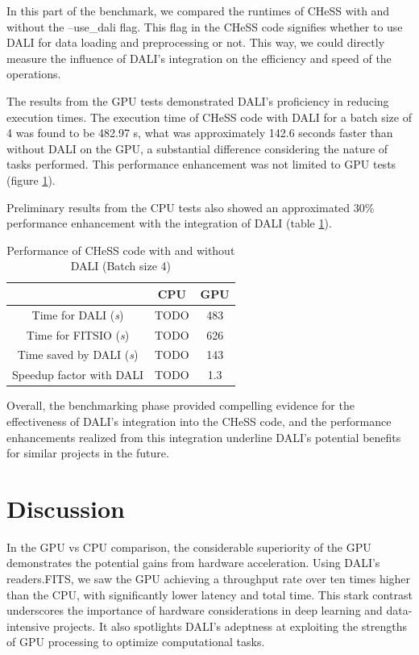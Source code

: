 \documentclass[licencjacka,en]{pracamgr}
\begin{document}
In this part of the benchmark, we compared the runtimes of CHeSS with and without the --use\_dali flag. This flag in the CHeSS code signifies whether to use DALI for data loading and preprocessing or not. This way, we could directly measure the influence of DALI's integration on the efficiency and speed of the operations.

The results from the GPU tests demonstrated DALI's proficiency in reducing execution times. The execution time of CHeSS code with DALI for a batch size of 4 was found to be 482.97 s, what was approximately 142.6 seconds faster than without DALI on the GPU, a substantial difference considering the nature of tasks performed. This performance enhancement was not limited to GPU tests (figure \ref{CHeSS}). 

Preliminary results from the CPU tests also showed an approximated 30\% performance enhancement with the integration of DALI (table \ref{CHeSS}).

\renewcommand{\arraystretch}{2}
\begin{table}[H]
    \centering
    \begin{tabular}{|c|c|c|}
        \hline
        & CPU & GPU \\\hline
        Time for DALI (\textit{s}) & TODO & 483 \\\hline
        Time for FITSIO (\textit{s}) & TODO & 626  \\\hline
        Time saved by DALI (\textit{s}) & TODO & 143  \\\hline
        Speedup factor with DALI & TODO & 1.3  \\\hline
    \end{tabular}
    \caption{\label{CHeSS} Performance of CHeSS code with and without DALI (Batch size 4)}
\end{table}


Overall, the benchmarking phase provided compelling evidence for the effectiveness of DALI's integration into the CHeSS code, and the performance enhancements realized from this integration underline DALI's potential benefits for similar projects in the future.

\section{Discussion}

In the GPU vs CPU comparison, the considerable superiority of the GPU demonstrates the potential gains from hardware acceleration. Using DALI's readers.FITS, we saw the GPU achieving a throughput rate over ten times higher than the CPU, with significantly lower latency and total time. This stark contrast underscores the importance of hardware considerations in deep learning and data-intensive projects. It also spotlights DALI's adeptness at exploiting the strengths of GPU processing to optimize computational tasks.
\end{document}
